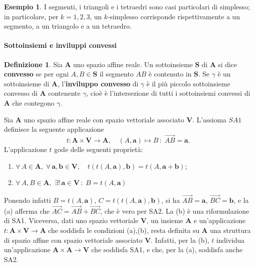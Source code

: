 \documentclass{article}
\theoremstyle{plain}
\theoremstyle{definition}
\newtheorem{defn}{Definizione}[section]
\newtheorem{exmp}{Esempio}[section]
\theoremstyle{remark}
\begin{document}
\vspace{10pt}

\begin{exmp}
    I segmenti, i triangoli e i tetraedri sono casi particolari di simplesso; in particolare, per $k=1,2,3$, un $k$-simplesso corrisponde rispettivamente a un segmento, a un triangolo e a un tetraedro.
\end{exmp}

\vspace{10pt}

\paragraph{Sottoinsiemi e inviluppi convessi}
\begin{bxthm}
\begin{defn}
Sia $\mathbf{A}$ uno spazio affine reale. Un sottoinsieme $\mathbf{S}$ di $\mathbf{A}$ si dice \textbf{convesso} se per ogni $A,B\in\mathbf{S}$ il segmento $AB$ è contenuto in $\mathbf{S}$.
Se $\gamma$ è un sottoinsieme di $\mathbf{A}$, l'\textbf{inviluppo convesso} di $\gamma$ è il più piccolo sottoinsieme convesso di $\mathbf{A}$ contenente $\gamma$, cioè è l'intersezione di tutti i sottoinsiemi convessi di $\mathbf{A}$ che contegono $\gamma$.    
\end{defn}
\end{bxthm}

\vspace{10pt}

Sia $\mathbf{A}$ uno spazio affine reale con spazio vettoriale associato $\mathbf{V}$. L'assioma $SA1$ definisce la seguente applicazione
\[t:\mathbf{A}\times\mathbf{V}\to\mathbf{A},\quad (A,\mathbf{a})\mapsto B\,:\;\overrightarrow{AB}=\mathbf{a}.\]
L'applicazione $t$ gode delle seguenti proprietà:
\begin{enumerate}
    \item $\forall\,A\in\mathbf{A},\;\forall\,\mathbf{a},\mathbf{b}\in\mathbf{V},\quad t(t(A,\mathbf{a}),\mathbf{b})=t(A,\mathbf{a}+\mathbf{b})$;
    \item $\forall\,A,B\in\mathbf{A},\;\exists!\,\mathbf{a}\in\mathbf{V}\,:\;B=t(A,\mathbf{a})$
\end{enumerate}
Ponendo infatti $B=t(A,\mathbf{a})$, $C=t(t(A,\mathbf{a}),\mathbf{b})$, si ha $\overrightarrow{AB}=\mathbf{a}$, $\overrightarrow{BC}=\mathbf{b}$, e la (a) afferma che $\overrightarrow{AC}=\overrightarrow{AB}+\overrightarrow{BC}$, che è vero per SA2.
La (b) è una riformulazione di SA1.
Viceversa, dati uno spazio vettoriale $\mathbf{V}$, un insieme $\mathbf{A}$ e un'applicazione $t:\mathbf{A}\times\mathbf{V}\to\mathbf{A}$ che soddisfa le condizioni (a),(b), resta definita su $\mathbf{A}$ una struttura di spazio affine con spazio vettoriale associato $\mathbf{V}$. 
Infatti, per la (b), $t$ individua un'applicazione $\mathbf{A}\times\mathbf{A}\to\mathbf{V}$ che soddisfa SA1, e che, per la (a), soddisfa anche SA2.
\end{document}
